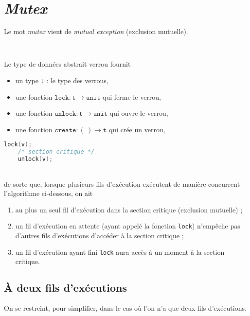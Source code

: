 \section{\textit{Mutex}}

Le mot \textit{mutex} vient de \textit{mutual exception} (exclusion mutuelle).

\begin{defn}~\\[2mm]
	\begin{minipage}{0.5\textwidth}
		Le type de données abstrait \textsf{verrou} fournit 
		\begin{itemize}
			\item un type \texttt{t} : le type des verrous,
			\item une fonction $\texttt{lock} : \texttt{t} \to \texttt{unit}$ qui ferme le verrou,
			\item une fonction $\texttt{unlock} : \texttt{t} \to \texttt{unit}$ qui ouvre le verrou,
			\item une fonction $\texttt{create} : (\:) \to \texttt{t}$ qui crée un verrou,
		\end{itemize}
	\end{minipage}
	\hfill
	\begin{minipage}{0.5\textwidth}
		\begin{lstlisting}[language=c]
	lock(v);
	/* section critique */
	unlock(v);
		\end{lstlisting}
	\end{minipage}\\
	de sorte que, lorsque plusieurs fils d'exécution exécutent de manière concurrent l'algorithme ci-dessous,
	on ait
	\begin{enumerate}
		\item au plus un seul fil d'exécution dans la section critique (exclusion mutuelle) ;
		\item un fil d'exécution en attente (ayant appelé la fonction \texttt{lock}) n'empêche pas d'autres fils d'exécutions d'accéder à la section critique ;
		\item un fil d'exécution ayant fini \texttt{lock} aura accès à un moment à la section critique.
	\end{enumerate}
\end{defn}

\subsection{À deux fils d'exécutions}
On se restreint, pour simplifier, dans le cas où l'on n'a que deux fils d'exécutions.

